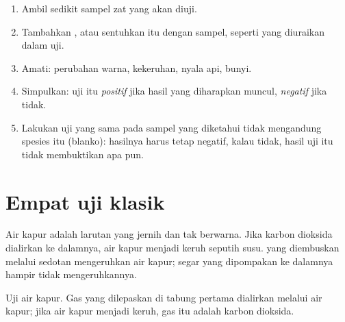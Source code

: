 \begin{method}\label{met:g7:identifying-substances:run}
\begin{enumerate}
  \item Ambil sedikit sampel zat yang akan diuji.
  \item Tambahkan , atau sentuhkan  itu dengan sampel,
        seperti yang diuraikan dalam uji.
  \item Amati: perubahan warna, kekeruhan, nyala api, bunyi.
  \item Simpulkan: uji itu \emph{positif} jika hasil yang diharapkan
        muncul, \emph{negatif} jika tidak.
  \item Lakukan uji yang sama pada sampel yang diketahui tidak
        mengandung spesies itu (blanko): hasilnya harus tetap negatif,
        kalau tidak, hasil uji itu tidak membuktikan apa pun.
\end{enumerate}
\end{method}

\section{Empat uji klasik}

\begin{proposition}\label{prop:g7:identifying-substances:limewater}
Air kapur adalah larutan yang jernih dan tak berwarna. Jika karbon
dioksida dialirkan ke dalamnya, air kapur menjadi keruh seputih susu.
 yang diembuskan melalui sedotan mengeruhkan air kapur; 
segar yang dipompakan ke dalamnya hampir tidak mengeruhkannya.
\end{proposition}

\begin{omfigure}

{\small Uji air kapur. Gas yang dilepaskan di tabung pertama dialirkan
melalui air kapur; jika air kapur menjadi keruh, gas itu adalah karbon
dioksida.}
\end{omfigure}

